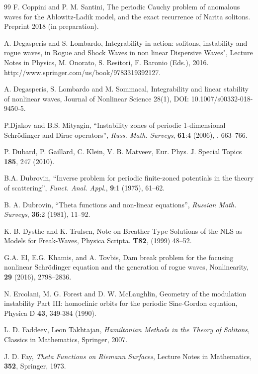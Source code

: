 \documentclass[12pt]{article}
\begin{document}
\begin{thebibliography}{99}
 F. Coppini and P. M. Santini, The periodic Cauchy problem of anomalous waves for the Ablowitz-Ladik model, and the exact recurrence of Narita solitons. Preprint 2018 (in preparation).
  
 A. Degasperis and S. Lombardo, Integrability in action: solitons, instability and rogue waves, in Rogue and Shock Waves in non linear Dispersive Waves", Lecture Notes in Physics, M. Onorato, S. Resitori, F. Baronio (Eds.), 2016. http://www.springer.com/us/book/9783319392127.

 A. Degasperis, S. Lombardo and M. Sommacal, Integrability and linear stability of nonlinear waves,  Journal of Nonlinear Science 28(1), DOI: 10.1007/s00332-018-9450-5.

 P.Djakov and B.S. Mityagin, ``Instability zones of periodic 1-dimensional Schr\"odinger and Dirac operators'', \textit{Russ. Math. Surveys}, \textbf{61}:4  (2006), , 663--766.

 P. Dubard, P. Gaillard, C. Klein, V. B. Matveev, Eur. Phys. J. Special Topics {\bf 185}, 247 (2010).

 B.A. Dubrovin, ``Inverse problem for periodic finite-zoned potentials in the theory of scattering'', \textit{Funct. Anal. Appl.}, \textbf{9}:1 (1975), 61--62.

 B. A. Dubrovin, ``Theta functions and non-linear equations'', \textit{Russian Math. Surveys}, \textbf{36}:2 (1981), 11--92.

 K. B. Dysthe and K. Trulsen, Note on Breather Type Solutions of the NLS as Models for Freak-Waves, Physica Scripta. {\bf T82}, (1999) 48--52.

 G.A. El, E.G. Khamis, and A. Tovbis, Dam break problem for the focusing nonlinear Schr\"odinger equation and the generation of rogue waves, Nonlinearity, \textbf{29} (2016), 2798--2836.

 N. Ercolani, M. G. Forest and D. W. McLaughlin, Geometry of the modulation instability Part III: homoclinic orbits for the periodic Sine-Gordon equation, Physica D {\bf 43}, 349-384 (1990).

 L. D. Faddeev, Leon Takhtajan, \textit{Hamiltonian Methods in the Theory of Solitons}, Classics in Mathematics, Springer, 2007.

 J. D. Fay, \textit{Theta Functions on Riemann Surfaces},  Lecture Notes in Mathematics, \textbf{352}, Springer, 1973.


\end{thebibliography}
\end{document}
